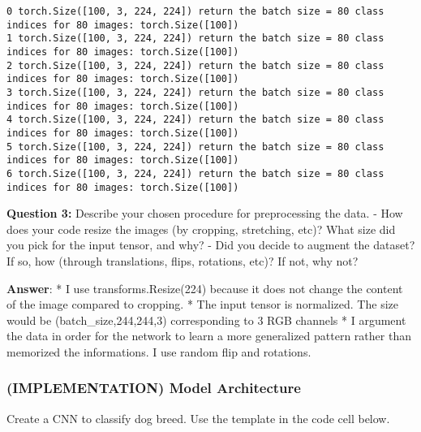 \documentclass[11pt]{article}
\begin{document}
    \begin{Verbatim}[commandchars=\\\{\}]
0 torch.Size([100, 3, 224, 224]) return the batch size = 80 class indices for 80 images: torch.Size([100])
1 torch.Size([100, 3, 224, 224]) return the batch size = 80 class indices for 80 images: torch.Size([100])
2 torch.Size([100, 3, 224, 224]) return the batch size = 80 class indices for 80 images: torch.Size([100])
3 torch.Size([100, 3, 224, 224]) return the batch size = 80 class indices for 80 images: torch.Size([100])
4 torch.Size([100, 3, 224, 224]) return the batch size = 80 class indices for 80 images: torch.Size([100])
5 torch.Size([100, 3, 224, 224]) return the batch size = 80 class indices for 80 images: torch.Size([100])
6 torch.Size([100, 3, 224, 224]) return the batch size = 80 class indices for 80 images: torch.Size([100])

    \end{Verbatim}

    \textbf{Question 3:} Describe your chosen procedure for preprocessing
the data. - How does your code resize the images (by cropping,
stretching, etc)? What size did you pick for the input tensor, and why?
- Did you decide to augment the dataset? If so, how (through
translations, flips, rotations, etc)? If not, why not?

    \textbf{Answer}: * I use transforms.Resize(224) because it does not
change the content of the image compared to cropping. * The input tensor
is normalized. The size would be (batch\_size,244,244,3) corresponding
to 3 RGB channels * I argument the data in order for the network to
learn a more generalized pattern rather than memorized the informations.
I use random flip and rotations.

    \hypertarget{implementation-model-architecture}{%
\subsubsection{(IMPLEMENTATION) Model
Architecture}\label{implementation-model-architecture}}

Create a CNN to classify dog breed. Use the template in the code cell
below.
\end{document}
